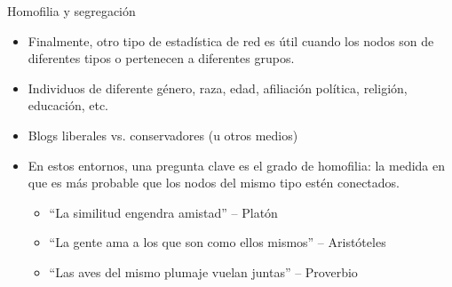 \documentclass[11pt]{beamer}
\begin{document}
\begin{frame}{Homofilia y segregación}
\begin{itemize}
    \item Finalmente, otro tipo de estadística de red es útil cuando los nodos son de diferentes tipos o pertenecen a diferentes grupos.
\item Individuos de diferente género, raza, edad, afiliación política, religión, educación, etc.
\item  Blogs liberales vs. conservadores (u otros medios)
\item En estos entornos, una pregunta clave es el grado de homofilia: la medida en que es más probable que los nodos del mismo tipo estén conectados.
\begin{itemize}
\item  “La similitud engendra amistad” – Platón
\item  “La gente ama a los que son como ellos mismos” – Aristóteles
\item  “Las aves del mismo plumaje vuelan juntas” – Proverbio
\end{itemize}
\end{itemize}    
\end{frame}
\end{document}
